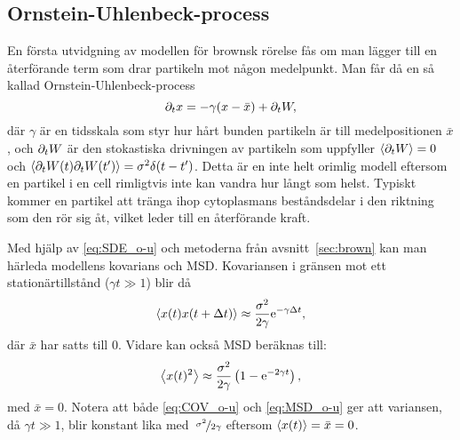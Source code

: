 \subsection{Ornstein-Uhlenbeck-process}
En första utvidgning av modellen för brownsk rörelse fås om man lägger till en återförande term som drar partikeln mot någon medelpunkt. Man får då en så kallad Ornstein-Uhlenbeck-process
\begin{equation}\label{eq:SDE_o-u}
\partial_t x = -\gamma ( x-\bar{x} ) + \partial_t W,
\end{equation}
där $\gamma$ är en tidsskala som styr hur hårt bunden partikeln är till medelpositionen $\bar{x}$, och $\partial_t W$ är den stokastiska drivningen av partikeln som uppfyller $\ev{\pd_t W}=0$ och $\ev{\pd_t W(t)\pd_t W(t')} = \sigma^2\delta(t-t')$. Detta är en inte helt orimlig modell eftersom en partikel i en cell rimligtvis inte kan vandra hur långt som helst. Typiskt kommer en partikel att tränga ihop cytoplasmans beståndsdelar i den riktning som den rör sig åt, vilket leder till en återförande kraft.

Med hjälp av \eqref{eq:SDE_o-u} och metoderna från avsnitt~\ref{sec:brown} kan man härleda modellens kovarians och MSD. Kovariansen i gränsen mot ett stationärtillstånd ($\gamma t\gg 1$) blir då
\begin{equation}\label{eq:COV_o-u}
\ev{x(t)x(t+\Delta{t})} \approx \frac{\sigma^2}{2\gamma} \ee^{-\gamma\Delta{t}},
\end{equation}
där $\bar{x}$ har satts till 0. Vidare kan också MSD beräknas till:
\begin{equation}\label{eq:MSD_o-u}
\ev{x(t)^2} 
\approx \frac{\sigma^2}{2\gamma} \left( 1-\ee^{-2\gamma t} \right),
\end{equation}
med $\bar{x}=0$. Notera att både \eqref{eq:COV_o-u} och \eqref{eq:MSD_o-u} ger att variansen, då $\gamma t\gg 1$, blir konstant lika med~$\nicefrac{\sigma^2}{2\gamma}$ eftersom $\ev{x(t)}=\bar{x}=0$.


  

